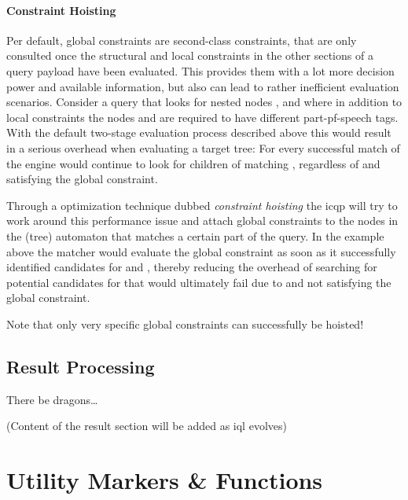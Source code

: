 \documentclass[11pt,a4paper]{article}
\begin{document}
\paragraph{Constraint Hoisting}
Per default, global constraints are second-class constraints, that are only consulted once the structural and local constraints in the other sections of a query payload have been evaluated.
This provides them with a lot more decision power and available information, but also can lead to rather inefficient evaluation scenarios.
Consider a query  that looks for nested nodes ,  and  where in addition to local constraints the nodes  and  are required to have different part-pf-speech tags.
With the default two-stage evaluation process described above this would result in a serious overhead when evaluating a target tree: 
For every successful match of \query{[\$x:~[\$y:]]} the engine would continue to look for children of  matching , regardless of  and  satisfying the global constraint.

Through a optimization technique dubbed \textit{constraint hoisting} the \ac{icqp} will try to work around this performance issue and attach global constraints to the nodes in the (tree) automaton that matches a certain part of the query.
In the example above the matcher would evaluate the global constraint  as soon as it successfully identified candidates for  and , thereby reducing the overhead of searching for potential candidates for  that would ultimately fail due to  and  not satisfying the global constraint.

Note that only very specific global constraints can successfully be hoisted! 

\subsection{Result Processing}
\label{sec:result-processing}

There be dragons\dots

(Content of the result section will be added as \ac{iql} evolves)

\section{Utility Markers \& Functions}
\label{sec:utility}
\end{document}
